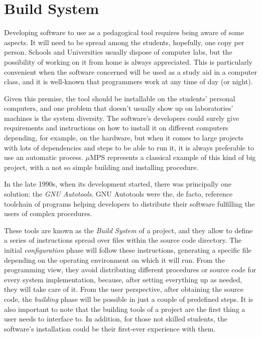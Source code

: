 \documentclass[12pt,a4paper,openright,twoside]{report}
\begin{document}
\section{Build System}
Developing software to use as a pedagogical tool requires being aware of some aspects.
It will need to be spread among the students, hopefully, one copy per person.
Schools and Universities usually dispose of computer labs, but the possibility of working on it from home is always appreciated.
This is particularly convenient when the software concerned will be used as a study aid in a computer class, and it is well-known that programmers work at any time of day (or night).

Given this premise, the tool should be installable on the students' personal computers, and one problem that doesn't usually show up on laboratories' machines is the system diversity.
The software's developers could surely give requirements and instructions on how to install it on different computers depending, for example, on the hardware, but when it comes to large projects with lots of dependencies and steps to be able to run it, it is always preferable to use an automatic process.
$\mu$MPS represents a classical example of this kind of big project, with a not so simple building and installing procedure.

In the late 1990s, when its development started, there was principally one solution: the \textit{GNU Autotools}.
GNU Autotools were the, de facto, reference toolchain of programs helping developers to distribute their software fulfilling the users of complex procedures.

These tools are known as the \textit{Build System} of a project, and they allow to define a series of instructions spread over files within the source code directory.
The initial \textit{configuration} phase will follow these instructions, generating a specific file depending on the operating environment on which it will run.
From the programming view, they avoid distributing different procedures or source code for every system implementation, because, after setting everything up as needed, they will take care of it.
From the user perspective, after obtaining the source code, the \textit{building} phase will be possible in just a couple of predefined steps.
It is also important to note that the building tools of a project are the first thing a user needs to interface to.
In addition, for those not skilled students, the software's installation could be their first-ever experience with them.
\end{document}
